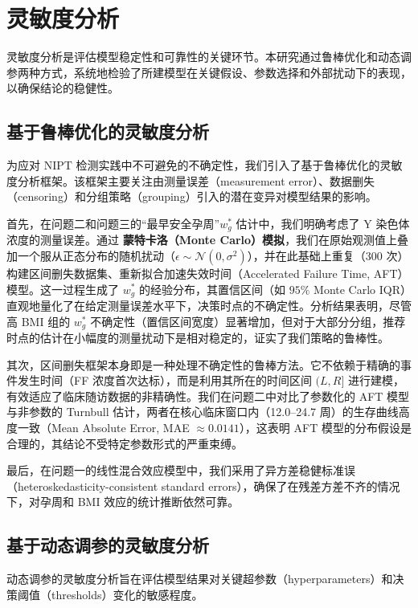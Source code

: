 \documentclass[withoutpreface]{cumcmthesis}
\begin{document}
\section{灵敏度分析}

灵敏度分析是评估模型稳定性和可靠性的关键环节。本研究通过鲁棒优化和动态调参两种方式，系统地检验了所建模型在关键假设、参数选择和外部扰动下的表现，以确保结论的稳健性。

\subsection{基于鲁棒优化的灵敏度分析}

为应对 NIPT 检测实践中不可避免的不确定性，我们引入了基于鲁棒优化的灵敏度分析框架。该框架主要关注由测量误差（measurement error）、数据删失（censoring）和分组策略（grouping）引入的潜在变异对模型结果的影响。

首先，在问题二和问题三的“最早安全孕周”$w_g^*$ 估计中，我们明确考虑了 Y 染色体浓度的测量误差。通过 \textbf{蒙特卡洛（Monte Carlo）模拟}，我们在原始观测值上叠加一个服从正态分布的随机扰动（$\epsilon \sim \mathcal{N}(0,\sigma^2)$），并在此基础上重复（300 次）构建区间删失数据集、重新拟合加速失效时间（Accelerated Failure Time, AFT）模型。这一过程生成了 $w_g^*$ 的经验分布，其置信区间（如 $95\%$ Monte Carlo IQR）直观地量化了在给定测量误差水平下，决策时点的不确定性。分析结果表明，尽管高 BMI 组的 $w_g^*$ 不确定性（置信区间宽度）显著增加，但对于大部分分组，推荐时点的估计在小幅度的测量扰动下是相对稳定的，证实了我们策略的鲁棒性。

其次，区间删失框架本身即是一种处理不确定性的鲁棒方法。它不依赖于精确的事件发生时间（FF 浓度首次达标），而是利用其所在的时间区间 $(L,R]$ 进行建模，有效适应了临床随访数据的非精确性。我们在问题二中对比了参数化的 AFT 模型与非参数的 Turnbull 估计，两者在核心临床窗口内（12.0--24.7 周）的生存曲线高度一致（Mean Absolute Error, MAE $\approx 0.0141$），这表明 AFT 模型的分布假设是合理的，其结论不受特定参数形式的严重束缚。

最后，在问题一的线性混合效应模型中，我们采用了异方差稳健标准误（heteroskedasticity-consistent standard errors），确保了在残差方差不齐的情况下，对孕周和 BMI 效应的统计推断依然可靠。

\subsection{基于动态调参的灵敏度分析}

动态调参的灵敏度分析旨在评估模型结果对关键超参数（hyperparameters）和决策阈值（thresholds）变化的敏感程度。
\end{document}
